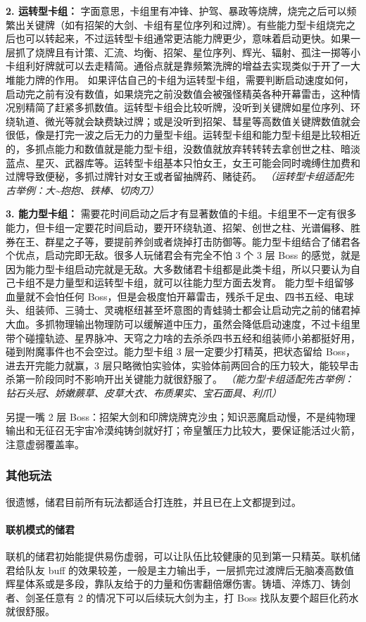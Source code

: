 ﻿\documentclass[12pt, a4paper]{article}
\begin{document}
\textbf{2. 运转型卡组：}
字面意思，卡组里有冲锋、护驾、暴政等烧牌，烧完之后可以频繁出关键牌（如有招架的大剑、卡组有星位序列和过牌）。有些能力型卡组烧完之后也可以转起来，不过运转型卡组通常更洁能力牌更少，意味着启动更快。如果一层抓了烧牌且有计策、汇流、均衡、招架、星位序列、辉光、辐射、孤注一掷等小卡组利好牌就可以去走精简。通俗点就是靠频繁洗牌的增益去实现类似于开了一大堆能力牌的作用。
如果评估自己的卡组为运转型卡组，需要判断启动速度如何，启动完之前有没有数值，如果烧完之前没数值会被强怪精英各种开幕雷击，这种情况别精简了赶紧多抓数值。运转型卡组会比较听牌，没听到关键牌如星位序列、环绕轨道、微光等就会缺费缺过牌；或是没听到招架、彗星等高数值关键牌数值就会很低，像是打完一波之后无力的力量型卡组。运转型卡组和能力型卡组是比较相近的，多抓点能力和数值就是能力型卡组，没数值就放弃转转转去拿创世之柱、暗淡蓝点、星灭、武器库等。运转型卡组基本只怕女王，女王可能会同时魂缚住加费和过牌导致便秘，多抓过牌针对女王或者留抽牌药、赌徒药。
\textit{（运转型卡组适配先古举例：大\textasciitilde 抱抱、铁棒、切肉刀）}

\textbf{3. 能力型卡组：}
需要花时间启动之后才有显著数值的卡组。卡组里不一定有很多能力，但卡组一定要花时间启动，要开环绕轨道、招架、创世之柱、光谱偏移、胜券在王、群星之子等，要提前养剑或者烧掉打击防御等。能力型卡组结合了储君各个优点，启动完即无敌。很多人玩储君会有完全不怕 3 个 3 层 Boss 的感觉，就是因为能力型卡组启动完就是无敌。大多数储君卡组都是此类卡组，所以只要认为自己卡组不是力量型和运转型卡组，就可以往能力型方面去发育。
能力型卡组留够血量就不会怕任何 Boss，但是会极度怕开幕雷击，残杀千足虫、四书五经、电球头、组装师、三骑士、灵魂枢纽甚至坏意图的青蛙骑士都会让启动完之前的储君掉大血。多抓物理输出物理防可以缓解道中压力，虽然会降低启动速度，不过卡组里带个碰撞轨迹、星界脉冲、天穹之力啥的去杀杀四书五经和组装师小弟都挺好用，碰到附魔事件也不会空过。能力型卡组 3 层一定要少打精英，把状态留给 Boss，进去开完能力就赢，3 层只略微怕实验体，实验体前两回合的压力较大，能较早击杀第一阶段同时不影响开出关键能力就很舒服了。
\textit{（能力型卡组适配先古举例：钻石头冠、娇嫩蕨草、皮草大衣、布质果实、宝石面具、利爪）}

另提一嘴 2 层 Boss：招架大剑和印牌烧牌克沙虫；知识恶魔启动慢，不是纯物理输出和无征召无宇宙冷漠纯铸剑就好打；帝皇蟹压力比较大，要保证能活过火箭，注意虚弱覆盖率。

\subsubsection{其他玩法}
很遗憾，储君目前所有玩法都适合打连胜，并且已在上文都提到过。

\paragraph{联机模式的储君}
联机的储君初始能提供易伤虚弱，可以让队伍比较健康的见到第一只精英。联机储君给队友 buff 的效果较差，一般是主力输出手，一层抓完过渡牌后无脑凑高数值辉星体系或是多段，靠队友给于的力量和伤害翻倍爆伤害。铸墙、淬炼刀、铸剑者、剑圣任意有 2 的情况下可以后续玩大剑为主，打 Boss 找队友要个超巨化药水就很舒服。
\end{document}
